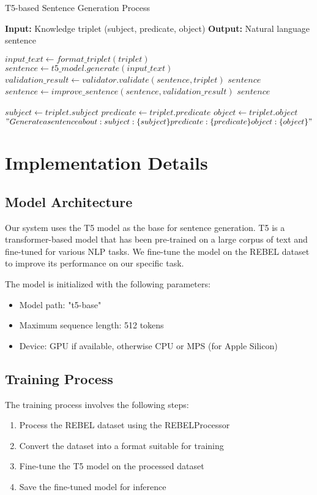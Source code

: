 \documentclass[3p,times,procedia]{elsarticle}
\begin{document}
\begin{algorithm}[ht!]
\caption{T5-based Sentence Generation Process}
\label{algo:t5_gen}
\begin{algorithmic}[1]
\State \textbf{Input:} Knowledge triplet (subject, predicate, object)
\State \textbf{Output:} Natural language sentence

    \State $input\_text \gets format\_triplet(triplet)$
    \State $sentence \gets t5\_model.generate(input\_text)$
    \State $validation\_result \gets validator.validate(sentence, triplet)$
        \State \Return $sentence$
    \Else
        \State $sentence \gets improve\_sentence(sentence, validation\_result)$
        \State \Return $sentence$
    \EndIf
\EndFunction

    \State $subject \gets triplet.subject$
    \State $predicate \gets triplet.predicate$
    \State $object \gets triplet.object$
    \State \Return $"Generate a sentence about: subject: \{subject\} predicate: \{predicate\} object: \{object\}"$
\EndFunction
\end{algorithmic}
\end{algorithm}

\section{Implementation Details}
\subsection{Model Architecture}
Our system uses the T5 model as the base for sentence generation. T5 is a transformer-based model that has been pre-trained on a large corpus of text and fine-tuned for various NLP tasks. We fine-tune the model on the REBEL dataset to improve its performance on our specific task.

The model is initialized with the following parameters:
\begin{itemize}
    \item Model path: "t5-base"
    \item Maximum sequence length: 512 tokens
    \item Device: GPU if available, otherwise CPU or MPS (for Apple Silicon)
\end{itemize}

\subsection{Training Process}
The training process involves the following steps:
\begin{enumerate}
    \item Process the REBEL dataset using the REBELProcessor
    \item Convert the dataset into a format suitable for training
    \item Fine-tune the T5 model on the processed dataset
    \item Save the fine-tuned model for inference
\end{enumerate}
\end{document}
